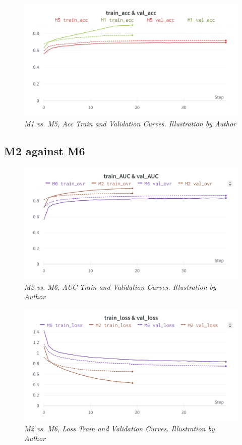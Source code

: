 \begin{figure}[H]
  \centering
  \includegraphics[width=\textwidth]{imatges/results/AccM1M5.png}
  \caption[M1 vs. M5, Acc Train and Validation Curves]{\textit{M1 vs. M5, Acc Train and Validation Curves. Illustration by Author}}
\end{figure}


\subsection{M2 against M6}

\begin{figure}[H]
  \centering
  \includegraphics[width=\textwidth]{imatges/results/AUCM2M6.png}
  \caption[M2 vs. M6, AUC Train and Validation Curves]{\textit{M2 vs. M6, AUC Train and Validation Curves. Illustration by Author}}
\end{figure}

\newpage

\begin{figure}[H]
  \centering
  \includegraphics[width=\textwidth]{imatges/results/LossM2M6.png}
  \caption[M2 vs. M6, Loss Train and Validation Curves]{\textit{M2 vs. M6, Loss Train and Validation Curves. Illustration by Author}}
\end{figure}


